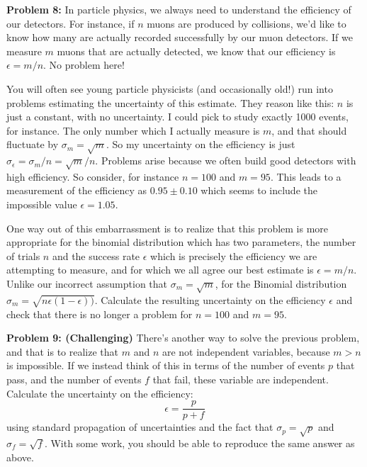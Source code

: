 \documentclass[12pt,oneside]{book}
\begin{document}
\noindent
{\bf Problem 8:}  In particle physics, we always need to understand the efficiency of our detectors.  For instance, if $n$ muons are produced by collisions, we'd like to know how many are actually recorded successfully by our muon detectors.  If we measure $m$ muons that are actually detected, we know that our efficiency is $\epsilon = m/n$.  No problem here!

You will often see young particle physicists (and occasionally old!) run into problems estimating the uncertainty of this estimate.  They reason like this:  $n$ is just a constant, with no uncertainty.  I could pick to study exactly 1000 events, for instance.  The only number which I actually measure is $m$, and that should fluctuate by $\sigma_m = \sqrt{m}$.  So my uncertainty on the efficiency is just $\sigma_\epsilon = \sigma_m/n = \sqrt{m}/n$.  Problems arise because we often build good detectors with high efficiency.  So consider, for instance $n=100$ and $m=95$.  This leads to a measurement of the efficiency as $0.95 \pm 0.10$ which seems to include the impossible value $\epsilon = 1.05$.

One way out of this embarrassment is to realize that this problem is more appropriate for the binomial distribution which has two parameters, the number of trials $n$ and the success rate $\epsilon$ which is precisely the efficiency we are attempting to measure, and for which we all agree our best estimate is $\epsilon = m/n$.  Unlike our incorrect assumption that $\sigma_m = \sqrt{m}$, for the Binomial distribution
$\sigma_m = \sqrt{n \epsilon (1 - \epsilon))}$.  Calculate the resulting uncertainty on the efficiency 
$\epsilon$ and check that there is no longer a problem for $n=100$ and $m=95$.

{\bf Problem 9: (Challenging)} There's another way to solve the
previous problem, and that is to realize that $m$ and $n$ are not
independent variables, because $m > n$ is impossible.  If we instead
think of this in terms of the number of events $p$ that pass, and the
number of events $f$ that fail, these variable are independent.
Calculate the uncertainty on the efficiency:
\begin{displaymath}
\epsilon = \frac{p}{p+f}
\end{displaymath}
using standard propagation of uncertainties and the fact that $\sigma_p = \sqrt{p}$ and $\sigma_f = \sqrt{f}$.  With some work, you should be able to reproduce the same answer as above. \\ \vskip 0.25cm
\end{document}
